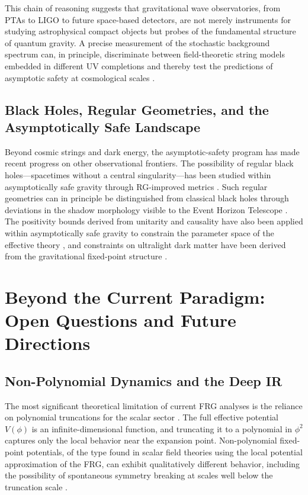 \documentclass[12pt,a4paper]{article}
\begin{document}
This chain of reasoning suggests that gravitational wave observatories, from
PTAs to LIGO \cite{Abbott2016} to future space-based detectors, are not
merely instruments for studying astrophysical compact objects but probes of
the fundamental structure of quantum gravity. A precise measurement of the
stochastic background spectrum can, in principle, discriminate between
field-theoretic string models embedded in different UV completions and thereby
test the predictions of asymptotic safety at cosmological scales
\cite{BuoninfanteEtal2025,Maggiore2008}.

\subsection{Black Holes, Regular Geometries, and the Asymptotically Safe Landscape}

Beyond cosmic strings and dark energy, the asymptotic-safety program has made
recent progress on other observational frontiers. The possibility of regular
black holes---spacetimes without a central singularity---has been studied within
asymptotically safe gravity through RG-improved metrics \cite{EichhornFernandes2025,
CarballoRubioEtal2025}. Such regular geometries can in principle be distinguished
from classical black holes through deviations in the shadow morphology visible
to the Event Horizon Telescope \cite{EichhornGoldHeld2023}. The positivity
bounds derived from unitarity and causality have also been applied within
asymptotically safe gravity to constrain the parameter space of the effective
theory \cite{EichhornSchifferPedersen2025}, and constraints on ultralight dark
matter have been derived from the gravitational fixed-point structure
\cite{AssantEichhornKnorr2025}.

\section{Beyond the Current Paradigm: Open Questions and Future Directions}

\subsection{Non-Polynomial Dynamics and the Deep IR}

The most significant theoretical limitation of current FRG analyses is the
reliance on polynomial truncations for the scalar sector \cite{Berges2002,
Dupuis2021}. The full effective potential $V(\phi)$ is an infinite-dimensional
function, and truncating it to a polynomial in $\phi^2$ captures only the
local behavior near the expansion point. Non-polynomial fixed-point potentials,
of the type found in scalar field theories using the local potential
approximation of the FRG, can exhibit qualitatively different behavior,
including the possibility of spontaneous symmetry breaking at scales well below
the truncation scale \cite{Goldenfeld1992,Stanley1971}.
\end{document}
